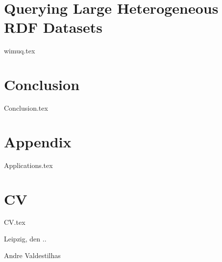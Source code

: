 \documentclass[ oneside,openright,titlepage,numbers=noenddot,headinclude,%
                footinclude=true,cleardoublepage=empty,abstractoff, %
                BCOR=5mm,paper=a4,fontsize=11pt,%
                 ngerman,american,%
                ]{scrreprt}
\begin{document}
\chapter{Querying Large Heterogeneous RDF Datasets} \label{ch:wimuq}
{wimuq.tex}

\newpage
\chapter{Conclusion} \label{ch:conclusion}
{Conclusion.tex}

\appendix

\newpage
\chapter{Appendix}
{Applications.tex}

\newpage
\chapter{CV} \label{ch:cv}
{CV.tex}

\newpage





\vspace{20pt}\noindent
Leipzig, den \the\day.\the\month.\the\year

\vspace{80pt}\noindent
Andre Valdestilhas
\end{document}

